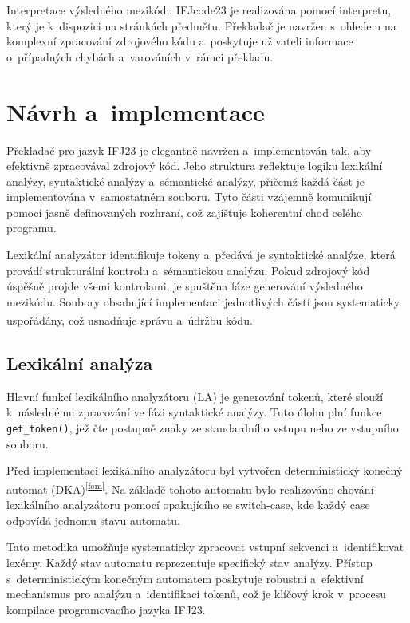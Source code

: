 \documentclass[a4paper, 11pt]{article}
\begin{document}
    Interpretace výsledného mezikódu IFJcode23 je realizována pomocí interpretu, který je k~dispozici na stránkách předmětu.
    Překladač je navržen s~ohledem na komplexní zpracování zdrojového kódu a~poskytuje uživateli informace o~případných chybách a~varováních v~rámci překladu.

\newpage

\section{Návrh a~implementace}
    Překladač pro jazyk IFJ23 je elegantně navržen a~implementován tak, aby efektivně zpracovával zdrojový kód.
    Jeho struktura reflektuje logiku lexikální analýzy, syntaktické analýzy a~sémantické analýzy, přičemž každá část je implementována v~samostatném souboru.
    Tyto části vzájemně komunikují pomocí jasně definovaných rozhraní, což zajišťuje koherentní chod celého programu.
    
    Lexikální analyzátor identifikuje tokeny a~předává je syntaktické analýze, která provádí strukturální kontrolu a~sémantickou analýzu.
    Pokud zdrojový kód úspěšně projde všemi kontrolami, je spuštěna fáze generování výsledného mezikódu.
    Soubory obsahující implementaci jednotlivých částí jsou systematicky uspořádány, což usnadňuje správu a~údržbu kódu\textsuperscript{\cite{IFJ}}.

\subsection{Lexikální analýza}
    Hlavní funkcí lexikálního analyzátoru (LA) je generování tokenů, které slouží k~následnému zpracování ve fázi syntaktické analýzy.
    Tuto úlohu plní funkce \texttt{get\_token()}, jež čte postupně znaky ze standardního vstupu nebo ze vstupního souboru.

    Před implementací lexikálního analyzátoru byl vytvořen deterministický konečný automat (DKA)\textsuperscript{\ref{fsm}}.
    Na základě tohoto automatu bylo realizováno chování lexikálního analyzátoru pomocí opakujícího se switch-case, kde každý case odpovídá jednomu stavu automatu.

    Tato metodika umožňuje systematicky zpracovat vstupní sekvenci a~identifikovat lexémy.
    Každý stav automatu reprezentuje specifický stav analýzy.
    Přístup s~deterministickým konečným automatem poskytuje robustní a~efektivní mechanismus pro analýzu a~identifikaci tokenů, což je klíčový krok v~procesu kompilace programovacího jazyka IFJ23.
\end{document}
